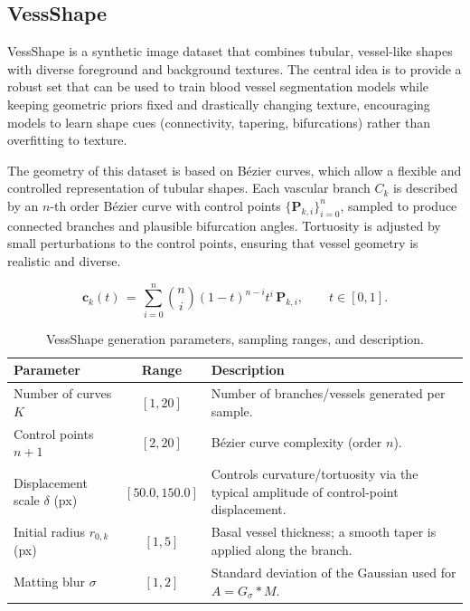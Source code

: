\documentclass[%
reprint,
nofootinbib,
 amsmath,amssymb,
aps,
superscriptaddress,
showkeys,
longbibliography
]{revtex4-1}
\begin{document}
\subsection{VessShape}

VessShape is a synthetic image dataset that combines tubular, vessel-like shapes with diverse foreground and background textures. The central idea is to provide a robust set that can be used to train blood vessel segmentation models while keeping geometric priors fixed and drastically changing texture, encouraging models to learn shape cues (connectivity, tapering, bifurcations) rather than overfitting to texture.

The geometry of this dataset is based on Bézier curves, which allow a flexible and controlled representation of tubular shapes. Each vascular branch $C_k$ is described by an $n$-th order Bézier curve with control points $\{\mathbf{P}_{k,i}\}_{i=0}^n$, sampled to produce connected branches and plausible bifurcation angles. Tortuosity is adjusted by small perturbations to the control points, ensuring that vessel geometry is realistic and diverse.

\begin{equation}
\mathbf{c}_k(t) \,=\, \sum_{i=0}^{n} \binom{n}{i} (1-t)^{n-i} t^{i} \, \mathbf{P}_{k,i}, \qquad t \in [0,1].
\label{eq:bezier}
\end{equation}

\begin{table}[t]
\caption{VessShape generation parameters, sampling ranges, and description.}
\label{tab:vessshape_params}
\centering
\begin{tabularx}{\textwidth}{l c X}
\hline
    \textbf{Parameter} & \textbf{Range} & \textbf{Description} \\
\hline
Number of curves $K$ & $[1,20]$ & Number of branches/vessels generated per sample. \\
Control points $n{+}1$ & $[2,20]$ & Bézier curve complexity (order $n$). \\
Displacement scale $\delta$ (px) & $[50.0,150.0]$ & Controls curvature/tortuosity via the typical amplitude of control-point displacement. \\
Initial radius $r_{0,k}$ (px) & $[1,5]$ & Basal vessel thickness; a smooth taper is applied along the branch. \\
Matting blur $\sigma$ & $[1,2]$ & Standard deviation of the Gaussian used for $A = G_{\sigma} * M$. \\

\hline
\end{tabularx}
\end{table}
\end{document}
